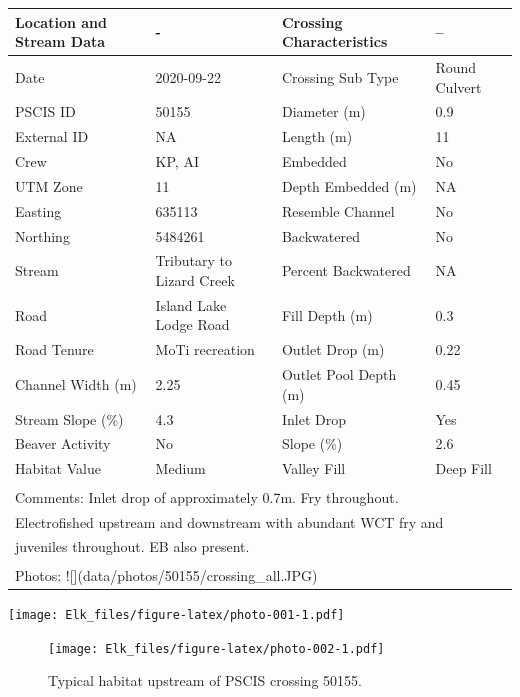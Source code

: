 \documentclass[
]{book}
\begin{document}
\begin{tabular}{l|l|l|l}
\hline
Location and Stream Data & - & Crossing Characteristics & --\\
\hline
Date & 2020-09-22 & Crossing Sub Type & Round Culvert\\
\hline
PSCIS ID & 50155 & Diameter (m) & 0.9\\
\hline
External ID & NA & Length (m) & 11\\
\hline
Crew & KP, AI & Embedded & No\\
\hline
UTM Zone & 11 & Depth Embedded (m) & NA\\
\hline
Easting & 635113 & Resemble Channel & No\\
\hline
Northing & 5484261 & Backwatered & No\\
\hline
Stream & Tributary to Lizard Creek & Percent Backwatered & NA\\
\hline
Road & Island Lake Lodge Road & Fill Depth (m) & 0.3\\
\hline
Road Tenure & MoTi recreation & Outlet Drop (m) & 0.22\\
\hline
Channel Width (m) & 2.25 & Outlet Pool Depth (m) & 0.45\\
\hline
Stream Slope (\%) & 4.3 & Inlet Drop & Yes\\
\hline
Beaver Activity & No & Slope (\%) & 2.6\\
\hline
Habitat Value & Medium & Valley Fill & Deep Fill\\
\hline
\multicolumn{4}{l}{\textsuperscript{} Comments: Inlet drop of approximately 0.7m.  Fry throughout.}\\
\multicolumn{4}{l}{Electrofished upstream and downstream with abundant WCT fry and}\\
\multicolumn{4}{l}{juveniles throughout.  EB also present.}\\
\multicolumn{4}{l}{\textsuperscript{} Photos: ![](data/photos/50155/crossing\_all.JPG)}\\
\end{tabular}

\texttt{[image: Elk\_files/figure-latex/photo-001-1.pdf]}

\begin{figure}
\centering
\texttt{[image: Elk\_files/figure-latex/photo-002-1.pdf]}
\caption{\label{fig:photo-002}Typical habitat upstream of PSCIS crossing 50155.}
\end{figure}

  
\end{document}
